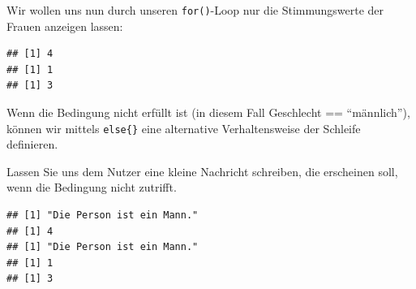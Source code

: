 \documentclass[
]{book}
\newenvironment{Shaded}{\begin{snugshade}}{\end{snugshade}}
\newcommand{\AttributeTok}[1]{\textcolor[rgb]{0.77,0.63,0.00}{#1}}
\newcommand{\ControlFlowTok}[1]{\textcolor[rgb]{0.13,0.29,0.53}{\textbf{#1}}}
\newcommand{\DecValTok}[1]{\textcolor[rgb]{0.00,0.00,0.81}{#1}}
\newcommand{\FunctionTok}[1]{\textcolor[rgb]{0.00,0.00,0.00}{#1}}
\newcommand{\NormalTok}[1]{#1}
\newcommand{\SpecialCharTok}[1]{\textcolor[rgb]{0.00,0.00,0.00}{#1}}
\newcommand{\StringTok}[1]{\textcolor[rgb]{0.31,0.60,0.02}{#1}}
\begin{document}
Wir wollen uns nun durch unseren \texttt{for()}-Loop nur die Stimmungswerte der Frauen anzeigen lassen:

\begin{Shaded}
\end{Shaded}

\begin{verbatim}
## [1] 4
## [1] 1
## [1] 3
\end{verbatim}

Wenn die Bedingung nicht erfüllt ist (in diesem Fall Geschlecht == ``männlich''), können wir mittels \texttt{else\{\}} eine alternative Verhaltensweise der Schleife definieren.

Lassen Sie uns dem Nutzer eine kleine Nachricht schreiben, die erscheinen soll, wenn die Bedingung nicht zutrifft.

\begin{Shaded}
\end{Shaded}

\begin{verbatim}
## [1] "Die Person ist ein Mann."
## [1] 4
## [1] "Die Person ist ein Mann."
## [1] 1
## [1] 3
\end{verbatim}
\end{document}
